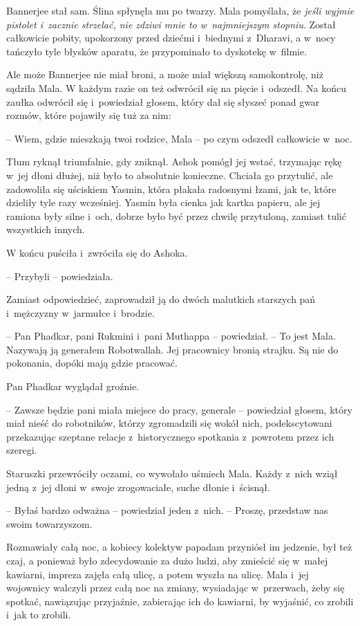 \documentclass[oneside,polish,11pt,rmheadings]{mwbk}
\begin{document}
Bannerjee stał sam. Ślina spłynęła mu po twarzy. Mala pomyślała, że \textit{jeśli wyjmie pistolet i~zacznie strzelać, nie zdziwi mnie to w~najmniejszym stopniu}. Został całkowicie pobity, upokorzony przed dziećmi i~biednymi z~Dharavi, a w~nocy tańczyło tyle błysków aparatu, że przypominało to dyskotekę w~filmie.

Ale może Bannerjee nie miał broni, a może miał większą samokontrolę, niż sądziła Mala. W każdym razie on też odwrócił się na pięcie i~odszedł. Na końcu zaułka odwrócił się i~powiedział głosem, który dał się słyszeć ponad gwar rozmów, które pojawiły się tuż za nim: 

-- Wiem, gdzie mieszkają twoi rodzice, Mala -- po czym odszedł całkowicie w~noc.

Tłum ryknął triumfalnie, gdy zniknął. Ashok pomógł jej wstać, trzymając rękę w~jej dłoni dłużej, niż było to absolutnie konieczne. Chciała go przytulić, ale zadowoliła się uściskiem Yasmin, która płakała radosnymi łzami, jak te, które dzieliły tyle razy wcześniej. Yasmin była cienka jak kartka papieru, ale jej ramiona były silne i~och, dobrze było być przez chwilę przytuloną, zamiast tulić wszystkich innych.

W końcu puściła i~zwróciła się do Ashoka. 

-- Przybyli -- powiedziała.

Zamiast odpowiedzieć, zaprowadził ją do dwóch malutkich starszych pań i~mężczyzny w~jarmułce i~brodzie. 

-- Pan Phadkar, pani Rukmini i~pani Muthappa -- powiedział. -- To jest Mala. Nazywają ją generałem Robotwallah. Jej pracownicy bronią strajku. Są nie do pokonania, dopóki mają gdzie pracować.

Pan Phadkar wyglądał groźnie. 

-- Zawsze będzie pani miała miejsce do pracy, generale -- powiedział głosem, który miał nieść do robotników, którzy zgromadzili się wokół nich, podekscytowani przekazując szeptane relacje z~historycznego spotkania z~powrotem przez ich szeregi.

Staruszki przewróciły oczami, co wywołało uśmiech Mala. Każdy z~nich wziął jedną z~jej dłoni w~swoje zrogowaciałe, suche dłonie i~ścisnął. 

-- Byłaś bardzo odważna -- powiedział jeden z~nich. -- Proszę, przedstaw nas swoim towarzyszom. 

Rozmawiały całą noc, a kobiecy kolektyw papadam przyniósł im jedzenie, był też czaj, a ponieważ było zdecydowanie za dużo ludzi, aby zmieścić się w~małej kawiarni, impreza zajęła całą ulicę, a potem wyszła na ulicę. Mala i~jej wojownicy walczyli przez całą noc na zmiany, wysiadając w~przerwach, żeby się spotkać, nawiązując przyjaźnie, zabierając ich do kawiarni, by wyjaśnić, co zrobili i~jak to zrobili.
\end{document}
